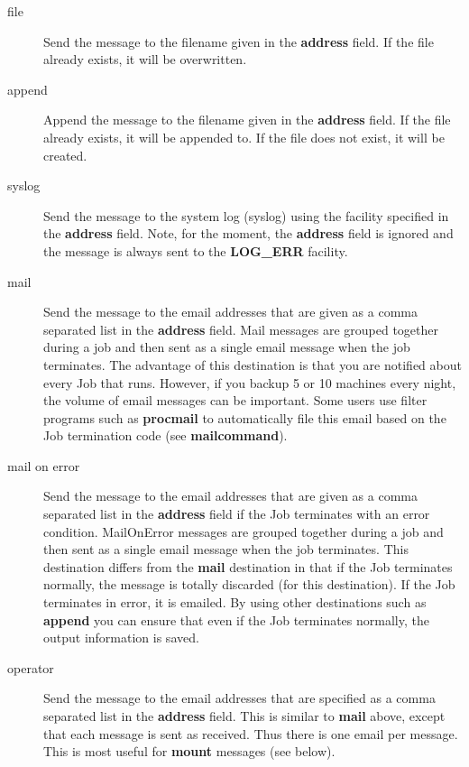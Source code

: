 \begin{description}
\begin{description}
\item [file]
   Send the message to the filename given in  the {\bf address} field. If the
file already exists, it will be  overwritten.  

\item [append]
   Append the message to the filename given  in the {\bf address} field. If the
file already exists, it will  be appended to. If the file does not exist, it
will be created.  

\item [syslog]
   Send the message to the system log (syslog)  using the facility specified in
the {\bf address} field.  Note, for the moment, the {\bf address} field is
ignored  and the message is always sent to the {\bf LOG\_ERR} facility.  

\item [mail]
   Send the message to the email addresses that are  given as a comma separated
list in the {\bf address} field.  Mail messages are grouped together during a
job and then  sent as a single email message when the job terminates.  The
advantage of this destination is that you are notified about  every Job that
runs. However, if you backup 5 or 10 machines every  night, the volume of
email messages can be important. Some users  use filter programs such as {\bf
procmail} to automatically file  this email based on the Job termination code
(see {\bf mailcommand}).  

\item [mail on error]
   Send the message to the email addresses  that are given as a comma separated
list in the {\bf address}  field if the Job terminates with an error
condition.  MailOnError messages are grouped together during a job and  then
sent as a single email message when the job terminates.  This destination
differs from the {\bf mail} destination in  that if the Job terminates
normally, the message is totally  discarded (for this destination). If the Job
terminates in  error, it is emailed. By using other destinations such as  {\bf
append} you can ensure that even if the Job terminates  normally, the output
information is saved.  

\item [operator]
   Send the message to the email addresses that  are specified as a comma
separated list in the {\bf address}  field. This is similar to {\bf mail}
above, except that each  message is sent as received. Thus there is one email
per message.  This is most useful for {\bf mount} messages (see below).  
\end{description}


\end{description}
